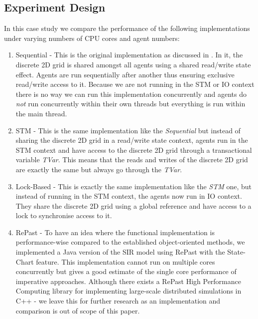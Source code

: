 \subsection{Experiment Design}
In this case study we compare the performance of the following implementations under varying numbers of CPU cores and agent numbers:

\begin{enumerate}
	\item Sequential - This is the original implementation as discussed in \cite{thaler_pure_2019}. In it, the discrete 2D grid is shared amongst all agents using a shared read/write state effect. Agents are run sequentially after another thus ensuring exclusive read/write access to it. Because we are not running in the STM or IO context there is no way we can run this implementation concurrently and agents do \textit{not} run concurrently within their own threads but everything is run within the main thread.
	\item STM - This is the same implementation like the \textit{Sequential} but instead of sharing the discrete 2D grid in a read/write state context, agents run in the STM context and have access to the discrete 2D grid through a transactional variable \textit{TVar}. This means that the reads and writes of the discrete 2D grid are exactly the same but always go through the \textit{TVar}.
	\item Lock-Based - This is exactly the same implementation like the \textit{STM} one, but instead of running in the STM context, the agents now run in IO context. They share the discrete 2D grid using a global reference and have access to a lock to synchronise access to it.
	\item RePast - To have an idea where the functional implementation is performance-wise compared to the established object-oriented methods, we implemented a Java version of the SIR model using RePast \cite{north_complex_2013} with the State-Chart feature. This implementation cannot run on multiple cores concurrently but gives a good estimate of the single core performance of imperative approaches. Although there exists a RePast High Performance Computing library for implementing large-scale distributed simulations in C++ - we leave this for further research as an implementation and comparison is out of scope of this paper.
\end{enumerate}


